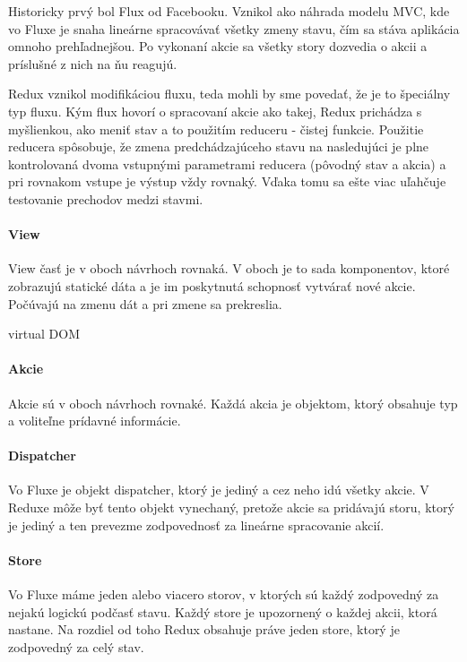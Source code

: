 Historicky prvý bol Flux od Facebooku. Vznikol ako náhrada modelu MVC, kde vo Fluxe je snaha lineárne spracovávať všetky zmeny stavu, čím sa stáva aplikácia omnoho prehľadnejšou. Po vykonaní akcie sa všetky story dozvedia o akcii a príslušné z nich na ňu reagujú.

Redux vznikol modifikáciou fluxu, teda mohli by sme povedať, že je to špeciálny typ fluxu. Kým flux hovorí o spracovaní akcie ako takej, Redux prichádza s myšlienkou, ako meniť stav a to použitím reduceru - čistej funkcie. Použitie reducera spôsobuje, že zmena predchádzajúceho stavu na nasledujúci je plne kontrolovaná dvoma vstupnými parametrami reducera (pôvodný stav a akcia) a pri rovnakom vstupe je výstup vždy rovnaký. Vďaka tomu sa ešte viac uľahčuje testovanie prechodov medzi stavmi.

\paragraph{View}%
View časť je v oboch návrhoch rovnaká. V oboch je to sada komponentov, ktoré zobrazujú statické dáta a je im poskytnutá schopnosť vytvárať nové akcie. Počúvajú na zmenu dát a pri zmene sa prekreslia.

\TODO{} virtual DOM

\paragraph{Akcie}
Akcie sú v oboch návrhoch rovnaké. Každá akcia je objektom, ktorý obsahuje typ a voliteľne prídavné informácie.

\paragraph{Dispatcher}
Vo Fluxe je objekt dispatcher, ktorý je jediný a cez neho idú všetky akcie. V Reduxe môže byť tento objekt vynechaný, pretože akcie sa pridávajú storu, ktorý je jediný a ten prevezme zodpovednosť za lineárne spracovanie akcií.

\paragraph{Store}
Vo Fluxe máme jeden alebo viacero storov, v ktorých sú každý zodpovedný za nejakú logickú podčasť stavu. Každý store je upozornený o každej akcii, ktorá nastane. Na rozdiel od toho Redux obsahuje práve jeden store, ktorý je zodpovedný za celý stav.


